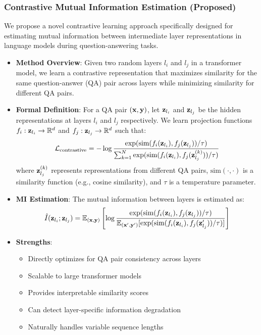 \subsubsection{Contrastive Mutual Information Estimation (Proposed)}
We propose a novel contrastive learning approach specifically designed for estimating mutual information between intermediate layer representations in language models during question-answering tasks.

\begin{itemize}
    \item \textbf{Method Overview}: Given two random layers $l_i$ and $l_j$ in a transformer model, we learn a contrastive representation that maximizes similarity for the same question-answer (QA) pair across layers while minimizing similarity for different QA pairs.

    \item \textbf{Formal Definition}: For a QA pair $({\mathbf{x}}, {\mathbf{y}})$, let ${\mathbf{z}}_{l_i}$ and ${\mathbf{z}}_{l_j}$ be the hidden representations at layers $l_i$ and $l_j$ respectively. We learn projection functions $f_i: {\mathbf{z}}_{l_i} \rightarrow \mathbb{R}^d$ and $f_j: {\mathbf{z}}_{l_j} \rightarrow \mathbb{R}^d$ such that:
    \[
    \mathcal{L}_{\text{contrastive}} = -\log \frac{\exp(\text{sim}(f_i({\mathbf{z}}_{l_i}), f_j({\mathbf{z}}_{l_j})) / \tau)}{\sum_{k=1}^{N} \exp(\text{sim}(f_i({\mathbf{z}}_{l_i}), f_j({\mathbf{z}}_{l_j}^{(k)})) / \tau)}
    \]
    where ${\mathbf{z}}_{l_j}^{(k)}$ represents representations from different QA pairs, $\text{sim}(\cdot, \cdot)$ is a similarity function (e.g., cosine similarity), and $\tau$ is a temperature parameter.

    \item \textbf{MI Estimation}: The mutual information between layers is estimated as:
    \[
    \hat{I}({\mathbf{z}}_{l_i}; {\mathbf{z}}_{l_j}) = \mathbb{E}_{({\mathbf{x}},{\mathbf{y}})} \left[ \log \frac{\exp(\text{sim}(f_i({\mathbf{z}}_{l_i}), f_j({\mathbf{z}}_{l_j})) / \tau)}{\mathbb{E}_{({\mathbf{x}}',{\mathbf{y}}')} [\exp(\text{sim}(f_i({\mathbf{z}}_{l_i}), f_j({\mathbf{z}}_{l_j}')) / \tau)]} \right]
    \]

    \item \textbf{Strengths}:
    \begin{itemize}
        \item Directly optimizes for QA pair consistency across layers
        \item Scalable to large transformer models
        \item Provides interpretable similarity scores
        \item Can detect layer-specific information degradation
        \item Naturally handles variable sequence lengths
    \end{itemize}


\end{itemize}
